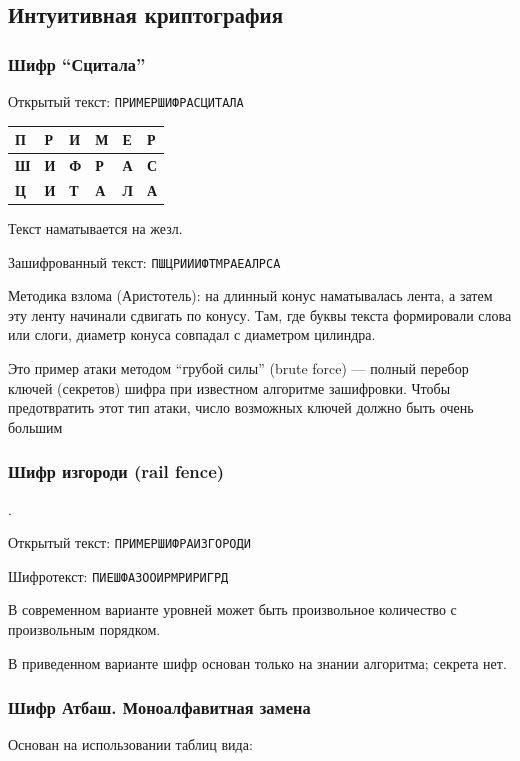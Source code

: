 \documentclass[a4paper, 14pt]{extarticle}
\begin{document}
\subsection{Интуитивная криптография}
\subsubsection{Шифр ``Сцитала''}

Открытый текст: \texttt{ПРИМЕРШИФРАСЦИТАЛА}

\begin{tabular}{|l|l|l|l|l|l|} %
\hline %
\textbf{П} & \textbf{Р} & \textbf{И} & \textbf{М} & \textbf{Е} & \textbf{Р} \\ \hline %
\textbf{Ш} & \textbf{И} & \textbf{Ф} & \textbf{Р} & \textbf{А} & \textbf{С} \\ \hline %
\textbf{Ц} & \textbf{И} & \textbf{Т} & \textbf{А} & \textbf{Л} & \textbf{А} \\ \hline %
\end{tabular}

Текст наматывается на жезл.

Зашифрованный текст: \texttt{ПШЦРИИИФТМРАЕАЛРСА}

Методика взлома (Аристотель): на длинный конус наматывалась лента, а затем эту ленту начинали сдвигать по конусу. Там, где буквы текста формировали слова или слоги, диаметр конуса совпадал с диаметром цилиндра.

Это пример атаки методом ``грубой силы'' (brute force) --- полный перебор ключей (секретов) шифра при известном алгоритме зашифровки. Чтобы предотвратить этот тип атаки, число возможных ключей должно быть очень большим

\subsubsection*{Шифр изгороди (rail fence)}.

Открытый текст: \texttt{ПРИМЕРШИФРАИЗГОРОДИ}


Шифротекст: \texttt{ПИЕШФАЗООИРМРИРИГРД}

В современном варианте уровней может быть произвольное количество с произвольным порядком.

В приведенном варианте шифр основан только на знании алгоритма; секрета нет.

\subsubsection{Шифр Атбаш. Моноалфавитная замена}
Основан на использовании таблиц вида:
\end{document}
